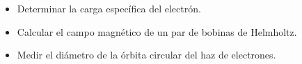\begin{itemize}
    \item Determinar la carga específica del electrón.
    \item Calcular el campo magnético de un par de bobinas de Helmholtz.
    \item Medir el diámetro de la órbita circular del haz de electrones.
\end{itemize}

